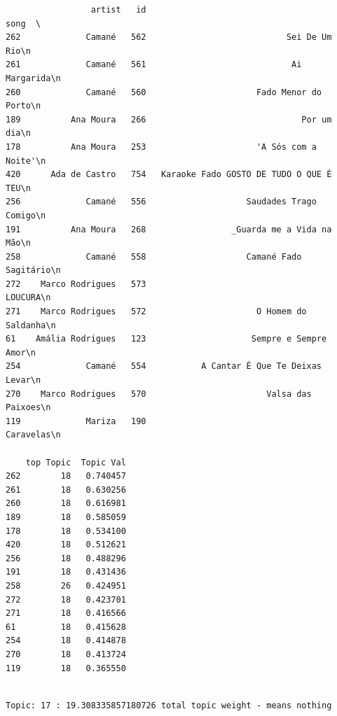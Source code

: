 \documentclass[11pt]{article}
\begin{document}
    
    \begin{verbatim}
                 artist   id                                       song  \
262             Camané   562                            Sei De Um Rio\n   
261             Camané   561                             Ai Margarida\n   
260             Camané   560                      Fado Menor do Porto\n   
189          Ana Moura   266                               Por um dia\n   
178          Ana Moura   253                      'A Sós com a Noite'\n   
420      Ada de Castro   754   Karaoke Fado GOSTO DE TUDO O QUE É TEU\n   
256             Camané   556                    Saudades Trago Comigo\n   
191          Ana Moura   268                 _Guarda me a Vida na Mão\n   
258             Camané   558                    Camané Fado Sagitário\n   
272    Marco Rodrigues   573                                  LOUCURA\n   
271    Marco Rodrigues   572                      O Homem do Saldanha\n   
61    Amália Rodrigues   123                     Sempre e Sempre Amor\n   
254             Camané   554           A Cantar É Que Te Deixas Levar\n   
270    Marco Rodrigues   570                        Valsa das Paixoes\n   
119             Mariza   190                                Caravelas\n   

    top Topic  Topic Val  
262        18   0.740457  
261        18   0.630256  
260        18   0.616981  
189        18   0.585059  
178        18   0.534100  
420        18   0.512621  
256        18   0.488296  
191        18   0.431436  
258        26   0.424951  
272        18   0.423701  
271        18   0.416566  
61         18   0.415628  
254        18   0.414878  
270        18   0.413724  
119        18   0.365550  
    \end{verbatim}

    
    \begin{Verbatim}[commandchars=\\\{\}]

Topic: 17 : 19.308335857180726 total topic weight - means nothing

    \end{Verbatim}
\end{document}
